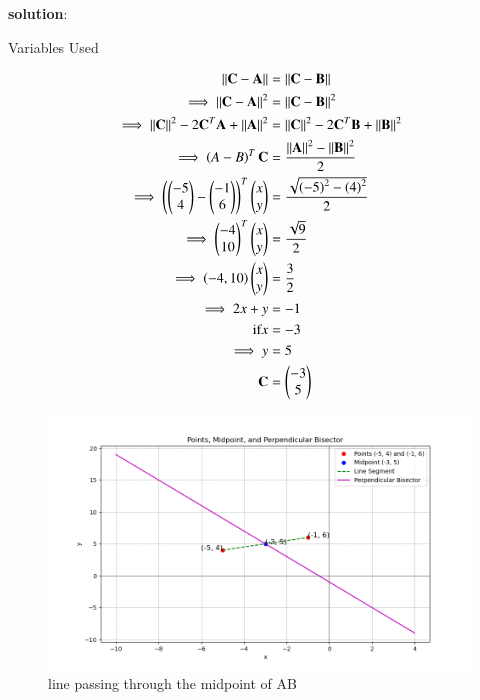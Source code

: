 \documentclass[journal]{IEEEtran}
\begin{document}
\textbf{solution}:\\
\begin{table}[h!]    
  \centering
  
  \caption{Variables Used}
  \label{tab1.1.8.21}
\end{table}
\begin{align}
\abs{\abs{\vec{C}-\vec{A}}}&=\abs{\abs{\vec{C}-\vec{B}}}\\
\implies\abs{\abs{\vec{C}-\vec{A}}}^2&=\abs{\abs{\vec{C}-\vec{B}}}^2\\
\implies\abs{\abs{\vec{C}}}^2-2\vec{C}^T\vec{A}+\abs{\abs{\vec{A}}}^2&=\abs{\abs{\vec{C}}}^2-2\vec{C}^T\vec{B}+\abs{\abs{\vec{B}}}^2\\
\implies\brak{A-B}^T\vec{C}&=\frac{\abs{\abs{\vec{A}}}^2-\abs{\abs{\vec{B}}}^2}{2}\\
\implies\brak{{\myvec{-5 \\ 4}}-{\myvec{-1 \\ 6}}}^T\myvec{x \\ y}&=\frac{\sqrt{\brak{-5}^2-\brak{4}^2}}{2}\\
\implies\myvec{-4 \\10}^T\myvec{x \\ y}&=\frac{\sqrt{9}}{2}\\
\implies\brak{-4 ,10}\myvec{x \\ y}&=\frac{3}{2}\\
\implies 2x+y&=-1\\
\text{if} x&=-3\\
\implies y&=5\\
\vec{C}&=\myvec{-3 \\ 5}
\end{align}
\begin{figure}[h!]
   \centering
   \includegraphics[width=0.7\linewidth]{figs/fig1.png}
   \caption{line passing through the midpoint of AB}
\end{figure}
\end{document}
